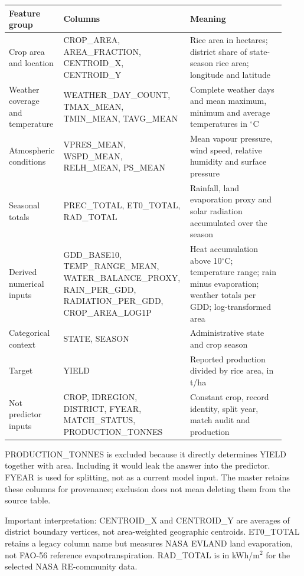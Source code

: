 \documentclass[11pt,a4paper]{article}
\begin{document}
{\small\renewcommand{\arraystretch}{1.22}\setlength{\tabcolsep}{4pt}\begin{tabular}{>{\raggedright\arraybackslash}p{0.186\linewidth}>{\raggedright\arraybackslash}p{0.3986\linewidth}>{\raggedright\arraybackslash}p{0.3454\linewidth}}\toprule
\textbf{Feature group} & \textbf{Columns} & \textbf{Meaning}\\\midrule
Crop area and location & CROP\_AREA, AREA\_FRACTION, CENTROID\_X, CENTROID\_Y & Rice area in hectares; district share of state-season rice area; longitude and latitude\\[3pt]
Weather coverage and temperature & WEATHER\_DAY\_COUNT, TMAX\_MEAN, TMIN\_MEAN, TAVG\_MEAN & Complete weather days and mean maximum, minimum and average temperatures in $^\circ$C\\[3pt]
Atmospheric conditions & VPRES\_MEAN, WSPD\_MEAN, RELH\_MEAN, PS\_MEAN & Mean vapour pressure, wind speed, relative humidity and surface pressure\\[3pt]
Seasonal totals & PREC\_TOTAL, ET0\_TOTAL, RAD\_TOTAL & Rainfall, land evaporation proxy and solar radiation accumulated over the season\\[3pt]
Derived numerical inputs & GDD\_BASE10, TEMP\_RANGE\_MEAN, WATER\_BALANCE\_PROXY, RAIN\_PER\_GDD, RADIATION\_PER\_GDD, CROP\_AREA\_LOG1P & Heat accumulation above 10$^\circ$C; temperature range; rain minus evaporation; weather totals per GDD; log-transformed area\\[3pt]
Categorical context & STATE, SEASON & Administrative state and crop season\\[3pt]
Target & YIELD & Reported production divided by rice area, in t/ha\\[3pt]
Not predictor inputs & CROP, IDREGION, DISTRICT, FYEAR, MATCH\_STATUS, PRODUCTION\_TONNES & Constant crop, record identity, split year, match audit and production\\[3pt]
\bottomrule\end{tabular}}\par
PRODUCTION\_TONNES is excluded because it directly determines YIELD together with area. Including it would leak the answer into the predictor. FYEAR is used for splitting, not as a current model input. The master retains these columns for provenance; exclusion does not mean deleting them from the source table.

Important interpretation: CENTROID\_X and CENTROID\_Y are averages of district boundary vertices, not area-weighted geographic centroids. ET0\_TOTAL retains a legacy column name but measures NASA EVLAND land evaporation, not FAO-56 reference evapotranspiration. RAD\_TOTAL is in kWh/m$^2$ for the selected NASA RE-community data.
\end{document}
